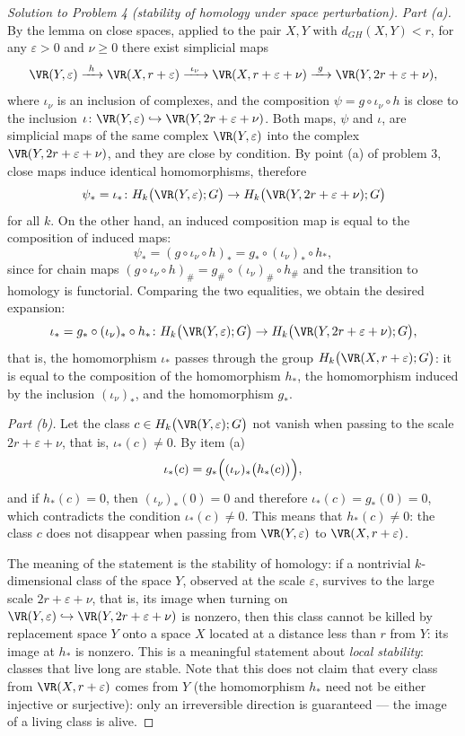 \documentclass[a4paper,12pt]{report}
\begin{document}
\begin{proof}[Solution to Problem \textup{4} \textup{(}stability of homology under space perturbation\textup{)}]
\textit{Part \textup{(a)}.} By the lemma on close spaces, applied to the pair $X,Y$ with $d_{GH}(X,Y)<r$, for any $\varepsilon>0$ and $\nu\ge0$ there exist simplicial maps
\[
\VR(Y,\varepsilon)\xrightarrow{\ h\ }\VR(X,r+\varepsilon)\xrightarrow{\ \iota_\nu\ }\VR(X,r+\varepsilon+\nu)\xrightarrow{\ g\ }\VR(Y,2r+\varepsilon+\nu),
\]
where $\iota_\nu$ is an inclusion of complexes, and the composition $\psi=g\circ\iota_\nu\circ h$ is close to the inclusion $\iota\colon\VR(Y,\varepsilon)\hookrightarrow\VR(Y,2r+\varepsilon+\nu)$. Both maps, $\psi$ and $\iota$, are simplicial maps of the same complex $\VR(Y,\varepsilon)$ into the complex $\VR(Y,2r+\varepsilon+\nu)$, and they are close by condition. By point \textup{(a)} of problem \textup{3}, close maps induce identical homomorphisms, therefore
\[
\psi_*=\iota_*\colon H_k\bigl(\VR(Y,\varepsilon);G\bigr)\to H_k\bigl(\VR(Y,2r+\varepsilon+\nu);G\bigr)
\]
for all $k$. On the other hand, an induced composition map is equal to the composition of induced maps:
\[
\psi_*=(g\circ\iota_\nu\circ h)_*=g_*\circ(\iota_\nu)_*\circ h_* ,
\]
since for chain maps $(g\circ\iota_\nu\circ h)_\#=g_\#\circ(\iota_\nu)_\#\circ h_\#$ and the transition to homology is functorial. Comparing the two equalities, we obtain the desired expansion:
\[
\iota_*=g_*\circ(\iota_\nu)_*\circ h_*\colon
H_k\bigl(\VR(Y,\varepsilon);G\bigr)\to H_k\bigl(\VR(Y,2r+\varepsilon+\nu);G\bigr),
\]
that is, the homomorphism $\iota_*$ passes through the group $H_k\bigl(\VR(X,r+\varepsilon);G\bigr)$: it is equal to the composition of the homomorphism $h_*$, the homomorphism induced by the inclusion $(\iota_\nu)_*$, and the homomorphism $g_*$.

\textit{Part \textup{(b)}.} Let the class $c\in H_k\bigl(\VR(Y,\varepsilon);G\bigr)$ not vanish when passing to the scale $2r+\varepsilon+\nu$, that is, $\iota_*(c)\ne0$. By item \textup{(a)}
\[
\iota_*(c)=g_*\Bigl((\iota_\nu)_*\bigl(h_*(c)\bigr)\Bigr),
\]
and if $h_*(c)=0$, then $(\iota_\nu)_*(0)=0$ and therefore $\iota_*(c)=g_*(0)=0$, which contradicts the condition $\iota_*(c)\ne0$. This means that $h_*(c)\ne0$: the class $c$ does not disappear when passing from $\VR(Y,\varepsilon)$ to $\VR(X,r+\varepsilon)$.

The meaning of the statement is the stability of homology: if a nontrivial $k$-dimensional class of the space $Y$, observed at the scale $\varepsilon$, survives to the large scale $2r+\varepsilon+\nu$, that is, its image when turning on $\VR(Y,\varepsilon)\hookrightarrow\VR(Y,2r+\varepsilon+\nu)$ is nonzero, then this class cannot be killed by replacement space $Y$ onto a space $X$ located at a distance less than $r$ from $Y$: its image at $h_*$ is nonzero. This is a meaningful statement about \emph{local stability}: classes that live long are stable. Note that this does not claim that every class from $\VR(X,r+\varepsilon)$ comes from $Y$ \textup{(}the homomorphism $h_*$ need not be either injective or surjective\textup{)}: only an irreversible direction is guaranteed --- the image of a living class is alive.


\end{proof}
\end{document}
